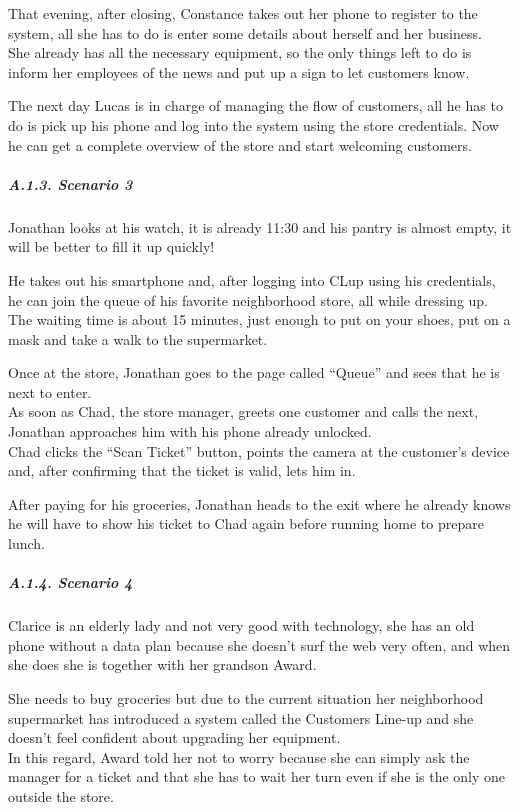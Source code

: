 \documentclass[
]{article}
\begin{document}
That evening, after closing, Constance takes out her phone to register
to the system, all she has to do is enter some details about herself and
her business.\\
She already has all the necessary equipment, so the only things left to
do is inform her employees of the news and put up a sign to let
customers know.

The next day Lucas is in charge of managing the flow of customers, all
he has to do is pick up his phone and log into the system using the
store credentials. Now he can get a complete overview of the store and
start welcoming customers.

\hypertarget{a.1.3.-scenario-3}{%
\subparagraph{\texorpdfstring{A.1.3. Scenario 3
}{A.1.3. Scenario 3 }}\label{a.1.3.-scenario-3}}

Jonathan looks at his watch, it is already 11:30 and his pantry is
almost empty, it will be better to fill it up quickly!

He takes out his smartphone and, after logging into CLup using his
credentials, he can join the queue of his favorite neighborhood store,
all while dressing up.\\
The waiting time is about 15 minutes, just enough to put on your shoes,
put on a mask and take a walk to the supermarket.

Once at the store, Jonathan goes to the page called ``Queue'' and sees
that he is next to enter.\\
As soon as Chad, the store manager, greets one customer and calls the
next, Jonathan approaches him with his phone already unlocked.\\
Chad clicks the ``Scan Ticket'' button, points the camera at the
customer's device and, after confirming that the ticket is valid, lets
him in.

After paying for his groceries, Jonathan heads to the exit where he
already knows he will have to show his ticket to Chad again before
running home to prepare lunch.

\hypertarget{a.1.4.-scenario-4}{%
\subparagraph{\texorpdfstring{A.1.4. Scenario 4
}{A.1.4. Scenario 4 }}\label{a.1.4.-scenario-4}}

Clarice is an elderly lady and not very good with technology, she has an
old phone without a data plan because she doesn't surf the web very
often, and when she does she is together with her grandson Award.

She needs to buy groceries but due to the current situation her
neighborhood supermarket has introduced a system called the Customers
Line-up and she doesn't feel confident about upgrading her equipment.\\
In this regard, Award told her not to worry because she can simply ask
the manager for a ticket and that she has to wait her turn even if she
is the only one outside the store.
\end{document}

